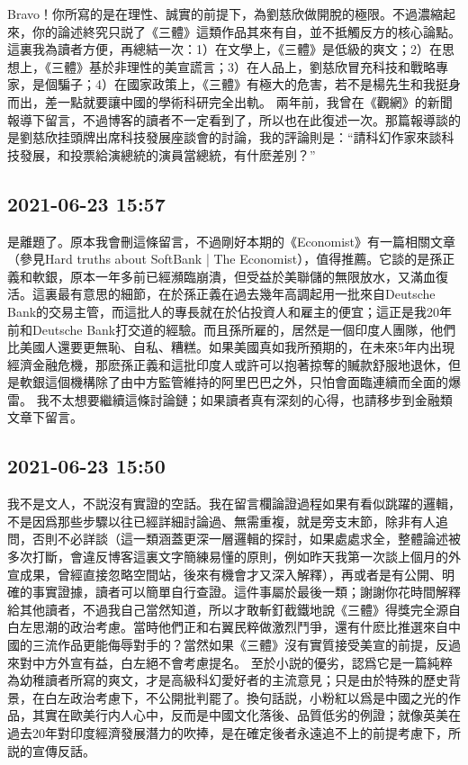 \documentclass[twocolumn]{ctexart}
\begin{document}
Bravo！你所寫的是在理性、誠實的前提下，為劉慈欣做開脫的極限。不過濃縮起來，你的論述終究只説了《三體》這類作品其來有自，並不抵觸反方的核心論點。這裏我為讀者方便，再總結一次：1）在文學上，《三體》是低級的爽文；2）在思想上，《三體》基於非理性的美宣謊言；3）在人品上，劉慈欣冒充科技和戰略專家，是個騙子；4）在國家政策上，《三體》有極大的危害，若不是楊先生和我挺身而出，差一點就要讓中國的學術科研完全出軌。
兩年前，我曾在《觀網》的新聞報導下留言，不過博客的讀者不一定看到了，所以也在此復述一次。那篇報導談的是劉慈欣挂頭牌出席科技發展座談會的討論，我的評論則是：“請科幻作家來談科技發展，和投票給演總統的演員當總統，有什麽差別？”
\subsection*{2021-06-23 15:57}

是離題了。原本我會刪這條留言，不過剛好本期的《Economist》有一篇相關文章（參見Hard truths about SoftBank | The Economist），值得推薦。它談的是孫正義和軟銀，原本一年多前已經瀕臨崩潰，但受益於美聯儲的無限放水，又滿血復活。這裏最有意思的細節，在於孫正義在過去幾年高調起用一批來自Deutsche Bank的交易主管，而這批人的專長就在於佔投資人和雇主的便宜；這正是我20年前和Deutsche Bank打交道的經驗。而且孫所雇的，居然是一個印度人團隊，他們比美國人還要更無恥、自私、糟糕。如果美國真如我所預期的，在未來5年内出現經濟金融危機，那麽孫正義和這批印度人或許可以抱著掠奪的贓款舒服地退休，但是軟銀這個機構除了由中方監管維持的阿里巴巴之外，只怕會面臨連續而全面的爆雷。
我不太想要繼續這條討論鏈；如果讀者真有深刻的心得，也請移步到金融類文章下留言。
\subsection*{2021-06-23 15:50}

我不是文人，不説沒有實證的空話。我在留言欄論證過程如果有看似跳躍的邏輯，不是因爲那些步驟以往已經詳細討論過、無需重複，就是旁支末節，除非有人追問，否則不必詳談（這一類涵蓋更深一層邏輯的探討，如果處處求全，整體論述被多次打斷，會違反博客這裏文字簡練易懂的原則，例如昨天我第一次談上個月的外宣成果，曾經直接忽略空間站，後來有機會才又深入解釋），再或者是有公開、明確的事實證據，讀者可以簡單自行查證。這件事屬於最後一類；謝謝你花時間解釋給其他讀者，不過我自己當然知道，所以才敢斬釘截鐵地說《三體》得獎完全源自白左思潮的政治考慮。當時他們正和右翼民粹做激烈鬥爭，還有什麽比推選來自中國的三流作品更能侮辱對手的？當然如果《三體》沒有實質接受美宣的前提，反過來對中方外宣有益，白左絕不會考慮提名。
至於小説的優劣，認爲它是一篇純粹為幼稚讀者所寫的爽文，才是高級科幻愛好者的主流意見；只是由於特殊的歷史背景，在白左政治考慮下，不公開批判罷了。換句話説，小粉紅以爲是中國之光的作品，其實在歐美行内人心中，反而是中國文化落後、品質低劣的例證；就像英美在過去20年對印度經濟發展潛力的吹捧，是在確定後者永遠追不上的前提考慮下，所説的宣傳反話。
\end{document}
